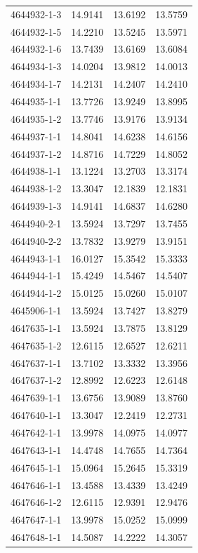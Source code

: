 \begin{longtable}{lrrr}
4644932-1-3 & 14.9141 & 13.6192 & 13.5759 \\
4644932-1-5 & 14.2210 & 13.5245 & 13.5971 \\
4644932-1-6 & 13.7439 & 13.6169 & 13.6084 \\
4644934-1-3 & 14.0204 & 13.9812 & 14.0013 \\
4644934-1-7 & 14.2131 & 14.2407 & 14.2410 \\
4644935-1-1 & 13.7726 & 13.9249 & 13.8995 \\
4644935-1-2 & 13.7746 & 13.9176 & 13.9134 \\
4644937-1-1 & 14.8041 & 14.6238 & 14.6156 \\
4644937-1-2 & 14.8716 & 14.7229 & 14.8052 \\
4644938-1-1 & 13.1224 & 13.2703 & 13.3174 \\
4644938-1-2 & 13.3047 & 12.1839 & 12.1831 \\
4644939-1-3 & 14.9141 & 14.6837 & 14.6280 \\
4644940-2-1 & 13.5924 & 13.7297 & 13.7455 \\
4644940-2-2 & 13.7832 & 13.9279 & 13.9151 \\
4644943-1-1 & 16.0127 & 15.3542 & 15.3333 \\
4644944-1-1 & 15.4249 & 14.5467 & 14.5407 \\
4644944-1-2 & 15.0125 & 15.0260 & 15.0107 \\
4645906-1-1 & 13.5924 & 13.7427 & 13.8279 \\
4647635-1-1 & 13.5924 & 13.7875 & 13.8129 \\
4647635-1-2 & 12.6115 & 12.6527 & 12.6211 \\
4647637-1-1 & 13.7102 & 13.3332 & 13.3956 \\
4647637-1-2 & 12.8992 & 12.6223 & 12.6148 \\
4647639-1-1 & 13.6756 & 13.9089 & 13.8760 \\
4647640-1-1 & 13.3047 & 12.2419 & 12.2731 \\
4647642-1-1 & 13.9978 & 14.0975 & 14.0977 \\
4647643-1-1 & 14.4748 & 14.7655 & 14.7364 \\
4647645-1-1 & 15.0964 & 15.2645 & 15.3319 \\
4647646-1-1 & 13.4588 & 13.4339 & 13.4249 \\
4647646-1-2 & 12.6115 & 12.9391 & 12.9476 \\
4647647-1-1 & 13.9978 & 15.0252 & 15.0999 \\
4647648-1-1 & 14.5087 & 14.2222 & 14.3057 \\

\end{longtable}
